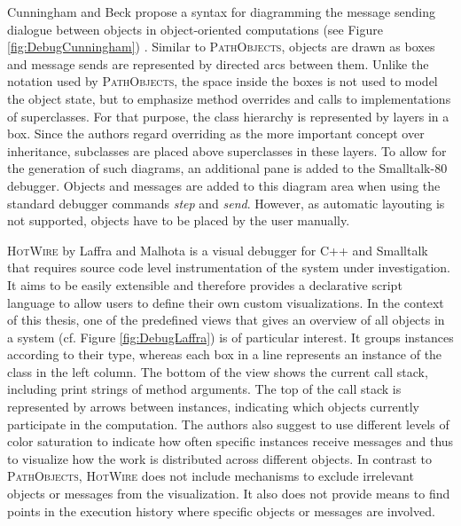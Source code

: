 Cunningham and Beck propose a syntax for diagramming the message sending dialogue between objects in object-oriented computations (see Figure \ref{fig:DebugCunningham}) \cite{cunningham_diagram_1986}.
Similar to \textsc{PathObjects}, objects are drawn as boxes and message sends are represented by directed arcs between them.
Unlike the notation used by \textsc{PathObjects}, the space inside the boxes is not used to model the object state, but to emphasize method overrides and calls to implementations of superclasses.
For that purpose, the class hierarchy is represented by layers in a box.
Since the authors regard overriding as the more important concept over inheritance, subclasses are placed above superclasses in these layers. 
To allow for the generation of such diagrams, an additional pane is added to the Smalltalk-80 debugger. 
Objects and messages are added to this diagram area when using the standard debugger commands \emph{step} and \emph{send}. 
However, as automatic layouting is not supported, objects have to be placed by the user manually.

\textsc{HotWire} by Laffra and Malhota \cite{laffra_hotwire:_1994} is a visual debugger for C++ and Smalltalk that requires source code level instrumentation of the system under investigation.
It aims to be easily extensible and therefore provides a declarative script language to allow users to define their own custom visualizations.
In the context of this thesis, one of the predefined views that gives an overview of all objects in a system (cf. Figure \ref{fig:DebugLaffra}) is of particular interest.
It groups instances according to their type, whereas each box in a line represents an instance of the class in the left column.
The bottom of the view shows the current call stack, including print strings of method arguments.
The top of the call stack is represented by arrows between instances, indicating which objects currently participate in the computation.
The authors also suggest to use different levels of color saturation to indicate how often specific instances receive messages and thus to visualize how the work is distributed across different objects.
In contrast to \textsc{PathObjects}, \textsc{HotWire} does not include mechanisms to exclude irrelevant objects or messages from the visualization.
It also does not provide means to find points in the execution history where specific objects or messages are involved.

